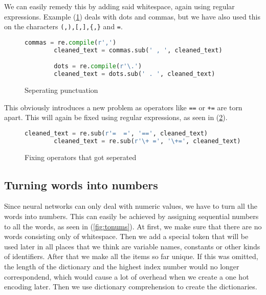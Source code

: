     We can easily remedy this by adding said whitespace, again using
    regular expressions.  Example (\ref{fig:puncts}) deals with
    dots and commas, but we have also used this on the characters
    \verb+(,),[,],{,}+ and \verb+=+.

    \begin{figure}[htpb]
      \centering \begin{lstlisting}[language=Python]
        commas = re.compile(r',')
        cleaned_text = commas.sub(' , ', cleaned_text)

        dots = re.compile(r'\.') 
        cleaned_text = dots.sub(' . ', cleaned_text) \end{lstlisting} 
        \caption{Seperating punctuation} 
        \label{fig:puncts}
    \end{figure}

    This obviously introduces a new problem as operators like \verb+==+
    or \verb|+=| are torn apart. This will again be fixed using regular expressions,
    as seen in (\ref{fig:operators}).

    \begin{figure}[htpb]
      \centering
      \begin{lstlisting}[language=Python]
        cleaned_text = re.sub(r'=  =', '==', cleaned_text)                                                                │                                                                                                        
        cleaned_text = re.sub(r'\+ =', '\+=', cleaned_text) \end{lstlisting}
      \caption{Fixing operators that got seperated}
      \label{fig:operators}
    \end{figure}

  \subsection{Turning words into numbers}
  \label{sub:turning_words_into_numbers}
  
    Since neural networks can only deal with numeric values, we have to turn all the words into numbers.
    This can easily be achieved by assigning sequential numbers to all the words, as seen in (\ref{fig:tonums}).
    At first, we make sure that there are no words consisting only of whitespace. Then we add a special token
    that will be used later in all places that we think are variable names, constants or other kinds
    of identifiers. After that we make all the items so far unique. If this was omitted, the length of the dictionary
    and the highest index number would no longer correspondend, which would cause a lot of overhead when we
    create a one hot encoding later. Then we use dictionary comprehension to create the dictionaries.

